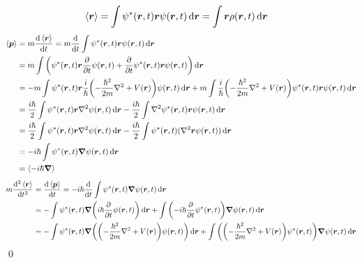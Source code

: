 \documentclass[uplatex,dvipdfmx,a4paper,11pt]{jlreq}
\makeatletter
\newcommand{\rr}{\bm{r}}
\newcommand{\pp}{\bm{p}}
\numberwithin{equation}{section}
\theoremstyle{definition}
\renewenvironment{proof}[1][\proofname]{\par
  \normalfont
  \topsep6\p@\@plus6\p@ \trivlist
  \item[\hskip\labelsep{\bfseries #1}\@addpunct{\bfseries}]\ignorespaces\quad\par
}{%
  \qed\endtrivlist\@endpefalse
}
\renewcommand\proofname{証明}
\makeatother
\begin{document}
\begin{proof}
  \begin{align}
    \ev{\rr} & = \int\psi^*(\rr, t)\rr\psi(\rr, t)\dd{\rr} = \int\rr\rho(\rr, t)\dd{\rr}
  \end{align}
  \begin{align}
    \ev{\pp} & = m\dv{\ev{\rr}}{t} = m\dv{t}\int\psi^*(\rr, t)\rr\psi(\rr, t)\dd{\rr}                                                                                                                                       \\
             & = m\int\qty(\psi^*(\rr, t)\rr\diffp{}{t}\psi(\rr, t) + \diffp{}{t}\psi^*(\rr, t)\rr\psi(\rr, t))\dd{\rr}                                                                                                     \\
             & = -m\int\psi^*(\rr, t)\rr\frac{i}{\hbar}\qty(-\frac{\hbar^2}{2m}\nabla^2 + V(\rr))\psi(\rr, t)\dd{\rr} + m\int\frac{i}{\hbar}\qty(-\frac{\hbar^2}{2m}\nabla^2 + V(\rr))\psi^*(\rr, t)\rr\psi(\rr, t)\dd{\rr} \\
             & = \frac{i\hbar}{2}\int\psi^*(\rr, t)\rr\nabla^2\psi(\rr, t)\dd{\rr} - \frac{i\hbar}{2}\int\nabla^2\psi^*(\rr, t)\rr\psi(\rr, t)\dd{\rr}                                                                      \\
             & = \frac{i\hbar}{2}\int\psi^*(\rr, t)\rr\nabla^2\psi(\rr, t)\dd{\rr} - \frac{i\hbar}{2}\int\psi^*(\rr, t)(\nabla^2\rr\psi(\rr, t))\dd{\rr}                                                                    \\
             & = -i\hbar\int\psi^*(\rr, t)\vnabla\psi(\rr, t)\dd{\rr}                                                                                                                                                       \\
             & = \ev{-i\hbar\vnabla}
  \end{align}
  \begin{align}
    m\dv[2]{\ev{\rr}}{t} & = \dv{\ev{\pp}}{t} = -i\hbar\dv{t}\int\psi^*(\rr, t)\vnabla\psi(\rr, t)\dd{\rr}                                                                                                                  \\
                         & = -\int\psi^*(\rr, t)\vnabla\qty(i\hbar\diffp{}{t}\psi(\rr, t))\dd{\rr} + \int\qty(-i\hbar\diffp{}{t}\psi^*(\rr, t))\vnabla\psi(\rr, t)\dd{\rr}                                                  \\
                         & = -\int\psi^*(\rr, t)\vnabla\qty(\qty(-\frac{\hbar^2}{2m}\nabla^2 + V(\rr))\psi(\rr, t))\dd{\rr} + \int\qty(\qty(-\frac{\hbar^2}{2m}\nabla^2 + V(\rr))\psi^*(\rr, t))\vnabla\psi(\rr, t)\dd{\rr} \\

\end{align}
\end{proof}
\end{document}
